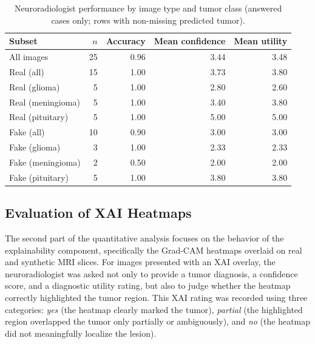 \begin{table}[H]
\centering
\caption{Neuroradiologist performance by image type and tumor class (answered cases only; rows with non-missing predicted tumor).}
\label{tab:hitl_answered_only}
\begin{tabular}{lrrrr}
\toprule
Subset & $n$ & Accuracy & Mean confidence & Mean utility \\
\midrule
All images         & 25 & 0.96 & 3.44 & 3.48 \\
\midrule
Real (all)         & 15 & 1.00 & 3.73 & 3.80 \\
\quad Real (glioma)      &  5 & 1.00 & 2.80 & 2.60 \\
\quad Real (meningioma)  &  5 & 1.00 & 3.40 & 3.80 \\
\quad Real (pituitary)   &  5 & 1.00 & 5.00 & 5.00 \\
\midrule
Fake (all)         & 10 & 0.90 & 3.00 & 3.00 \\
\quad Fake (glioma)      &  3 & 1.00 & 2.33 & 2.33 \\
\quad Fake (meningioma)  &  2 & 0.50 & 2.00 & 2.00 \\
\quad Fake (pituitary)   &  5 & 1.00 & 3.80 & 3.80 \\
\bottomrule
\end{tabular}
\end{table}

\clearpage
\subsection{Evaluation of XAI Heatmaps}


The second part of the quantitative analysis focuses on the behavior of the explainability component, specifically the Grad-CAM heatmaps overlaid on real and synthetic MRI slices. For images presented with an XAI overlay, the neuroradiologist was asked not only to provide a tumor diagnosis, a confidence score, and a diagnostic utility rating, but also to judge whether the heatmap correctly highlighted the tumor region. This XAI rating was recorded using three categories: \emph{yes} (the heatmap clearly marked the tumor), \emph{partial} (the highlighted region overlapped the tumor only partially or ambiguously), and \emph{no} (the heatmap did not meaningfully localize the lesion).


